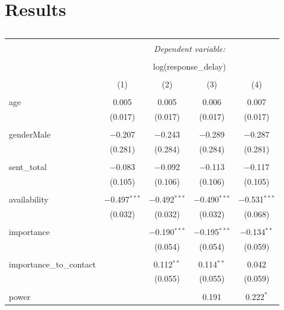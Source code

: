\documentclass[12pt]{nuthesis}	%
\begin{document}
\section{Results}

\begin{table}[!htbp] \tiny \centering 
  \caption{} 
  \label{} 
\begin{tabular}{@{\extracolsep{5pt}}lcccc} 
\\[-1.8ex]\hline 
\hline \\[-1.8ex] 
 & \multicolumn{4}{c}{\textit{Dependent variable:}} \\ 
\cline{2-5} 
\\[-1.8ex] & \multicolumn{4}{c}{log(response\_delay)} \\ 
\\[-1.8ex] & (1) & (2) & (3) & (4)\\ 
\hline \\[-1.8ex] 
 age & 0.005 & 0.005 & 0.006 & 0.007 \\ 
  & (0.017) & (0.017) & (0.017) & (0.017) \\ 
  & & & & \\ 
 genderMale & $-$0.207 & $-$0.243 & $-$0.289 & $-$0.287 \\ 
  & (0.281) & (0.284) & (0.284) & (0.281) \\ 
  & & & & \\ 
 sent\_total & $-$0.083 & $-$0.092 & $-$0.113 & $-$0.117 \\ 
  & (0.105) & (0.106) & (0.106) & (0.105) \\ 
  & & & & \\ 
 availability & $-$0.497$^{***}$ & $-$0.492$^{***}$ & $-$0.490$^{***}$ & $-$0.531$^{***}$ \\ 
  & (0.032) & (0.032) & (0.032) & (0.068) \\ 
  & & & & \\ 
 importance &  & $-$0.190$^{***}$ & $-$0.195$^{***}$ & $-$0.134$^{**}$ \\ 
  &  & (0.054) & (0.054) & (0.059) \\ 
  & & & & \\ 
 importance\_to\_contact &  & 0.112$^{**}$ & 0.114$^{**}$ & 0.042 \\ 
  &  & (0.055) & (0.055) & (0.059) \\ 
  & & & & \\ 
 power &  &  & 0.191 & 0.222$^{*}$ \\ 

\end{tabular}
\end{table}
\end{document}
